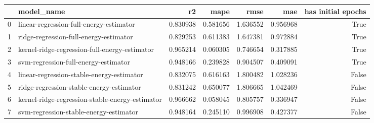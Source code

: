 \begin{tabular}{llrrrrr}
\toprule
 & model_name & r2 & mape & rmse & mae & has initial epochs \\
\midrule
0 & linear-regression-full-energy-estimator & 0.830938 & 0.581656 & 1.636552 & 0.956968 & True \\
1 & ridge-regression-full-energy-estimator & 0.829253 & 0.611383 & 1.647381 & 0.972884 & True \\
2 & kernel-ridge-regression-full-energy-estimator & 0.965214 & 0.060305 & 0.746654 & 0.317885 & True \\
3 & svm-regression-full-energy-estimator & 0.948166 & 0.239828 & 0.904507 & 0.409091 & True \\
4 & linear-regression-stable-energy-estimator & 0.832075 & 0.616163 & 1.800482 & 1.028236 & False \\
5 & ridge-regression-stable-energy-estimator & 0.831242 & 0.650077 & 1.806665 & 1.042469 & False \\
6 & kernel-ridge-regression-stable-energy-estimator & 0.966662 & 0.058045 & 0.805757 & 0.336947 & False \\
7 & svm-regression-stable-energy-estimator & 0.948164 & 0.245110 & 0.996908 & 0.427377 & False \\
\bottomrule
\end{tabular}

